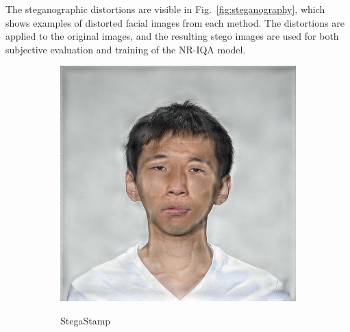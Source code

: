 The steganographic distortions are visible in Fig.~\ref{fig:steganography}, which shows examples of distorted facial images from each method. The distortions are applied to the original images, and the resulting stego images are used for both subjective evaluation and training of the NR-IQA model.

\begin{figure}[ht]
    \centering
    \begin{subfigure}[t]{0.22\textwidth}
        \centering
        \includegraphics[width=\textwidth]{images/005_StegaStamp_1.4.jpg}\\
        \caption{StegaStamp}\label{fig:steganography_a}
    \end{subfigure}
    \hfill
    \begin{subfigure}[t]{0.22\textwidth}
        \centering

\end{subfigure}
\end{figure}

